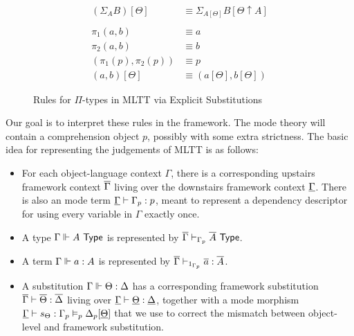 \documentclass[10pt]{article}
\theoremstyle{definition}
\newcommand{\yields}{\vdash}
\newcommand{\TYPE}{\,\,\mathsf{Type}}
\begin{document}
\begin{figure}
\begin{align}
(\Sigma_A B)[\Theta] &\equiv \Sigma_{A[\Theta]} B[\Theta \uparrow A] \\
\nonumber\\
\pi_1(a, b) &\equiv a \\
\pi_2(a, b) &\equiv b \\
(\pi_1(p), \pi_2(p)) &\equiv p \\
(a, b)[\Theta] &\equiv (a[\Theta], b[\Theta])
\end{align}
\caption{Rules for $\Pi$-types in MLTT via Explicit Substitutions}\label{fig:qit-sigma-rules}
\end{figure}

Our goal is to interpret these rules in the framework. The mode theory will contain a comprehension object $p$, possibly with some extra strictness. The basic idea for representing the judgements of MLTT is as follows:
\begin{itemize}
\item For each object-language context $\Gamma$, there is a corresponding upstairs framework context $\overline{\Gamma}$ living over the downstairs framework context $\underline{\Gamma}$. There is also an mode term $\downstairs{\Gamma} \yields \asdep{\Gamma} : p$, meant to represent a dependency descriptor for using every variable in $\Gamma$ exactly once.

\item A type $\Gamma \qyields A \TYPE$ is represented by $\upstairs{\Gamma} \yields_{\asdep{\Gamma}} \upstairs{A} \TYPE$.
  
\item A term $\Gamma \Vdash a : A$ is represented by $\upstairs{\Gamma} \yields_{1_{\asdep{\Gamma}}} \upstairs{a} : \upstairs{A}$.

\item A substitution $\Gamma \Vdash \Theta : \Delta$ has a corresponding framework substitution $\upstairs{\Gamma} \yields \upstairs{\Theta} : \upstairs{\Delta}$ living over $\downstairs{\Gamma} \yields \downstairs{\Theta} : \downstairs{\Delta}$, together with a mode morphism $\downstairs{\Gamma} \yields s_\Theta : \asdep{\Gamma} \vDash_p \asdep{\Delta}[\downstairs{\Theta}]$ that we use to correct the mismatch between object-level and framework substitution.
\end{itemize}
\end{document}
